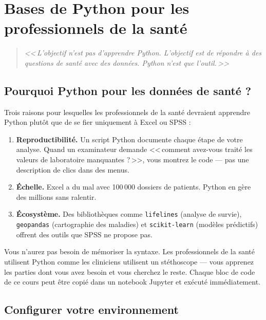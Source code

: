 \chapter{Bases de Python pour les professionnels de la sant\'e}
\label{ch:bases-python}

\begin{quote}
\emph{<<\,L'objectif n'est pas d'apprendre Python. L'objectif est de r\'epondre \`a des questions de sant\'e avec des donn\'ees. Python n'est que l'outil.\,>>}
\end{quote}

\section{Pourquoi Python pour les donn\'ees de sant\'e ?}

Trois raisons pour lesquelles les professionnels de la sant\'e devraient apprendre Python plut\^ot que de se fier uniquement \`a Excel ou SPSS :

\begin{enumerate}
  \item \textbf{Reproductibilit\'e.} Un script Python documente chaque \'etape de votre analyse. Quand un examinateur demande <<\,comment avez-vous trait\'e les valeurs de laboratoire manquantes ?\,>>, vous montrez le code --- pas une description de clics dans des menus.
  \item \textbf{\'Echelle.} Excel a du mal avec 100\,000 dossiers de patients. Python en g\`ere des millions sans ralentir.
  \item \textbf{\'Ecosyst\`eme.} Des biblioth\`eques comme \texttt{lifelines} (analyse de survie), \texttt{geopandas} (cartographie des maladies) et \texttt{scikit-learn} (mod\`eles pr\'edictifs) offrent des outils que SPSS ne propose pas.
\end{enumerate}

\begin{clinicalnote}
Vous n'aurez pas besoin de m\'emoriser la syntaxe. Les professionnels de la sant\'e utilisent Python comme les cliniciens utilisent un st\'ethoscope --- vous apprenez les parties dont vous avez besoin et vous cherchez le reste. Chaque bloc de code de ce cours peut \^etre copi\'e dans un notebook Jupyter et ex\'ecut\'e imm\'ediatement.
\end{clinicalnote}

\section{Configurer votre environnement}

